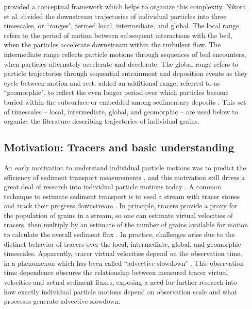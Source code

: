 \citet{Nikora2001,Nikora2002} provided a conceptual framework which helps to organize this complexity.
Nikora et al. divided the downstream trajectories of individual particles into three timescales, or ``ranges", termed local, intermediate, and global.
The local range refers to the period of motion between subsequent interactions with the bed, when the particles accelerate downstream within the turbulent flow.
The intermediate range reflects particle motions through sequences of bed encounters, when particles alternately accelerate and decelerate. 
The global range refers to particle trajectories through sequential entrainment and deposition events as they cycle between motion and rest.
\citet{Hassan2017} added an additional range, referred to as ``geomorphic", to reflect the even longer period over which particles become buried within the subsurface or embedded among sedimentary deposits \citep{Bradley2017}.
This set of timescales -- local, intermediate, global, and geomorphic -- are used below to organize the literature describing trajectories of individual grains.

\subsection{Motivation: Tracers and basic understanding}

An early motivation to understand individual particle motions was to predict the efficiency of sediment transport measurements \citep{Ettema2004}, and this motivation still drives a great deal of research into individual particle motions today \citep{Hassan2017,Pretzlav2021}.
A common technique to estimate sediment transport is to seed a stream with tracer stones and track their progress downstream \citep{Einstein1937, Takayama1965, Pretzlav2021}.
In principle, tracers provide a proxy for the population of grains in a stream, so one can estimate virtual velocities of tracers, then multiply by an estimate of the number of grains available for motion to calculate the overall sediment flux \citep{Wilcock1997a,Ferguson2002}.
In practice, challenges arise due to the distinct behavior of tracers over the local, intermediate, global, and geomorphic timescales. Apparently, tracer virtual velocities depend on the observation time, in a phenomenon which has been called ``advective slowdown" \citep{Ferguson2002,Haschenburger2011, Haschenburger2013, Pelosi2016}. This observation-time dependence obscures the relationship between measured tracer virtual velocities and actual sediment fluxes, exposing a need for further research into how exactly individual particle motions depend on observation scale and what processes generate advective slowdown.

